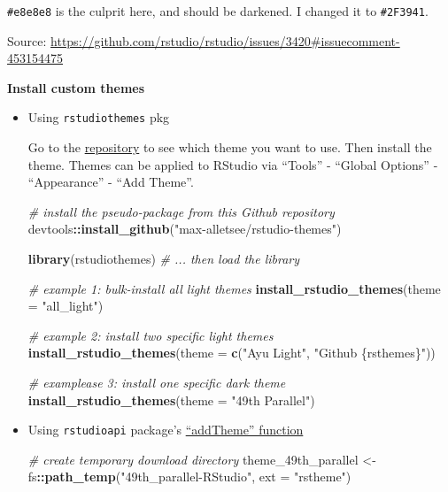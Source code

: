 \documentclass[
]{book}
\newenvironment{Shaded}{\begin{snugshade}}{\end{snugshade}}
\newcommand{\AttributeTok}[1]{\textcolor[rgb]{0.13,0.29,0.53}{#1}}
\newcommand{\CommentTok}[1]{\textcolor[rgb]{0.56,0.35,0.01}{\textit{#1}}}
\newcommand{\FunctionTok}[1]{\textcolor[rgb]{0.13,0.29,0.53}{\textbf{#1}}}
\newcommand{\NormalTok}[1]{#1}
\newcommand{\OtherTok}[1]{\textcolor[rgb]{0.56,0.35,0.01}{#1}}
\newcommand{\SpecialCharTok}[1]{\textcolor[rgb]{0.81,0.36,0.00}{\textbf{#1}}}
\newcommand{\StringTok}[1]{\textcolor[rgb]{0.31,0.60,0.02}{#1}}
\theoremstyle{definition}
\theoremstyle{definition}
\theoremstyle{definition}
\theoremstyle{definition}
\theoremstyle{remark}
\begin{document}
\texttt{\#e8e8e8} is the culprit here, and should be darkened. I changed it to \texttt{\#2F3941}.

Source: \url{https://github.com/rstudio/rstudio/issues/3420\#issuecomment-453154475}

\textbf{Install custom themes}

\begin{itemize}
\item
  Using \texttt{rstudiothemes} pkg

  Go to the \href{https://github.com/max-alletsee/rstudio-themes?tab=readme-ov-file}{repository} to see which theme you want to use. Then install the theme. Themes can be applied to RStudio via ``Tools'' - ``Global Options'' - ``Appearance'' - ``Add Theme''.

\begin{Shaded}
\begin{Highlighting}[]
\CommentTok{\# install the pseudo{-}package from this Github repository}
\NormalTok{devtools}\SpecialCharTok{::}\FunctionTok{install\_github}\NormalTok{(}\StringTok{"max{-}alletsee/rstudio{-}themes"}\NormalTok{)}

\FunctionTok{library}\NormalTok{(rstudiothemes) }\CommentTok{\# ... then load the library}

\CommentTok{\# example 1: bulk{-}install all light themes}
\FunctionTok{install\_rstudio\_themes}\NormalTok{(}\AttributeTok{theme =} \StringTok{"all\_light"}\NormalTok{)}

\CommentTok{\# example 2: install two specific light themes}
\FunctionTok{install\_rstudio\_themes}\NormalTok{(}\AttributeTok{theme =} \FunctionTok{c}\NormalTok{(}\StringTok{"Ayu Light"}\NormalTok{, }\StringTok{"Github \{rsthemes\}"}\NormalTok{))}

\CommentTok{\# examplease 3: install one specific dark theme}
\FunctionTok{install\_rstudio\_themes}\NormalTok{(}\AttributeTok{theme =} \StringTok{"49th Parallel"}\NormalTok{)}
\end{Highlighting}
\end{Shaded}
\item
  Using \texttt{rstudioapi} package's \href{https://rdrr.io/cran/rstudioapi/man/addTheme.html}{``addTheme'' function}

\begin{Shaded}
\begin{Highlighting}[]
\CommentTok{\# create temporary download directory}
\NormalTok{theme\_49th\_parallel }\OtherTok{\textless{}{-}}\NormalTok{ fs}\SpecialCharTok{::}\FunctionTok{path\_temp}\NormalTok{(}\StringTok{"49th\_parallel{-}RStudio"}\NormalTok{, }
                                     \AttributeTok{ext =} \StringTok{"rstheme"}\NormalTok{)}


\end{Highlighting}
\end{Shaded}
\end{itemize}
\end{document}
